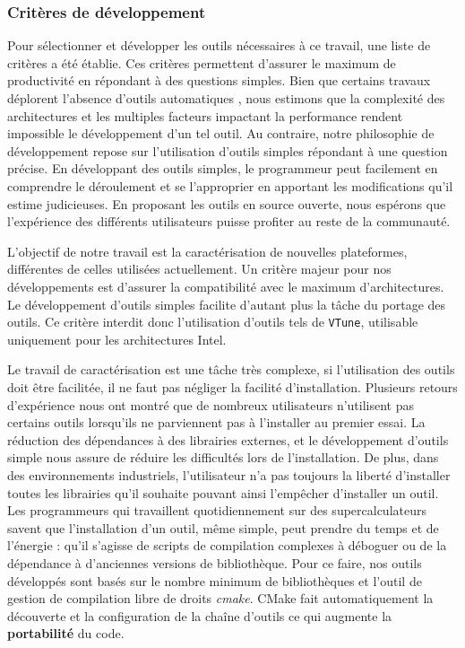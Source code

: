     \subsubsection{Critères de développement}
        
        Pour sélectionner et développer les outils nécessaires à ce travail, une liste de critères a été établie. Ces critères permettent d'assurer le maximum de productivité en répondant à des questions simples. Bien que certains travaux déplorent l'absence d'outils automatiques \cite{Chung2012}, nous estimons que la complexité des architectures et les multiples facteurs impactant la performance rendent impossible le développement d'un tel outil. Au contraire, notre philosophie de développement repose sur l'utilisation d'outils simples répondant à une question précise. En développant des outils simples, le programmeur peut facilement en comprendre le déroulement et se l'approprier en apportant les modifications qu'il estime judicieuses. En proposant les outils en source ouverte, nous espérons que l'expérience des différents utilisateurs puisse profiter au reste de la communauté.
        
        L'objectif de notre travail est la caractérisation de nouvelles plateformes, différentes de celles utilisées actuellement. Un critère majeur pour nos développements est d'assurer la compatibilité avec le maximum d'architectures. Le développement d'outils simples facilite d'autant plus la tâche du portage des outils. Ce critère interdit donc l'utilisation d'outils tels de \verb=VTune=, utilisable uniquement pour les architectures Intel.
        
        Le travail de caractérisation est une tâche très complexe, si l'utilisation des outils doit être facilitée, il ne faut pas négliger la facilité d'installation. Plusieurs retours d'expérience nous ont montré que de nombreux utilisateurs n'utilisent pas certains outils lorsqu'ils ne parviennent pas à l'installer au premier essai. La réduction des dépendances à des librairies externes, et le développement d'outils simple nous assure de réduire les difficultés lors de l'installation. De plus, dans des environnements industriels, l'utilisateur n'a pas toujours la liberté d'installer toutes les librairies qu'il souhaite pouvant ainsi l'empêcher d'installer un outil. 
        Les programmeurs qui travaillent quotidiennement sur des supercalculateurs savent que l'installation d'un outil, même simple, peut prendre du temps et de l'énergie : qu'il s'agisse de scripts de compilation complexes à déboguer ou de la dépendance à d’anciennes versions de bibliothèque. Pour ce faire, nos outils développés sont basés sur le nombre minimum de bibliothèques et l'outil de gestion de compilation libre de droits \textit{cmake}. CMake fait automatiquement la découverte et la configuration de la chaîne d'outils ce qui augmente la \textbf{portabilité} du code. 

